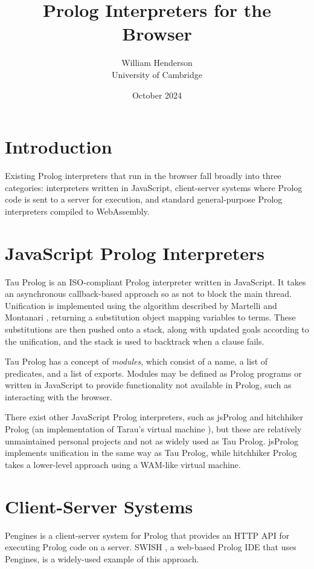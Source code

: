 \documentclass{article}
\title{Prolog Interpreters for the Browser}
\author{William Henderson \\
University of Cambridge}
\date{October 2024}
\begin{document}
\maketitle

\section{Introduction}

Existing Prolog interpreters that run in the browser fall broadly into three categories: interpreters written in JavaScript, client-server systems where Prolog code is sent to a server for execution, and standard general-purpose Prolog interpreters compiled to WebAssembly.

\section{JavaScript Prolog Interpreters}

Tau Prolog \cite{tauprolog} is an ISO-compliant Prolog interpreter written in JavaScript. It takes an asynchronous callback-based approach so as not to block the main thread. Unification is implemented using the algorithm described by Martelli and Montanari \cite{mm}, returning a substitution object mapping variables to terms. These substitutions are then pushed onto a stack, along with updated goals according to the unification, and the stack is used to backtrack when a clause fails.

Tau Prolog has a concept of \emph{modules}, which consist of a name, a list of predicates, and a list of exports. Modules may be defined as Prolog programs or written in JavaScript to provide functionality not available in Prolog, such as interacting with the browser.

There exist other JavaScript Prolog interpreters, such as jsProlog \cite{jsprolog} and hitchhiker Prolog \cite{hitchhiker} (an implementation of Tarau's virtual machine \cite{tarau}), but these are relatively unmaintained personal projects and not as widely used as Tau Prolog. jsProlog implements unification in the same way as Tau Prolog, while hitchhiker Prolog takes a lower-level approach using a WAM-like virtual machine.

\section{Client-Server Systems}

Pengines \cite{pengines} is a client-server system for Prolog that provides an HTTP API for executing Prolog code on a server. SWISH \cite{swish}, a web-based Prolog IDE that uses Pengines, is a widely-used example of this approach.
\end{document}
